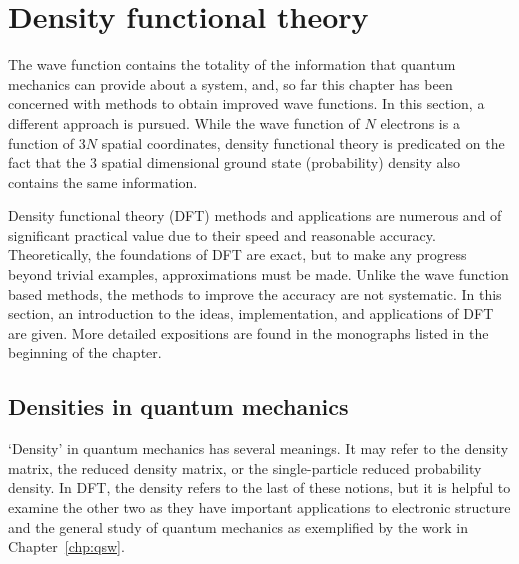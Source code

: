\documentclass[11pt,oneside,final]{huthesis}%
\begin{document}




 
\section{Density functional theory}\label{sec:dft}

The wave function  contains the totality of the information that quantum mechanics can provide about a system, and, so far this chapter has been concerned with methods to obtain improved wave functions.  In this section, a different approach is pursued.  While the wave function of $N$ electrons is a function of $3N$ spatial coordinates, density functional theory is predicated on the fact that the $3$ spatial dimensional ground state (probability) density also contains the same information. 

Density functional theory (DFT) methods and applications are numerous and of significant practical value due to their  speed and reasonable accuracy.  Theoretically, the foundations of DFT are exact, but to make any progress beyond trivial examples, approximations must be made.  Unlike the wave function based methods, the methods to improve the accuracy are not systematic.  In this section, an introduction to the ideas, implementation, and applications of DFT are given.  More detailed expositions are found in the monographs listed in the beginning of the chapter.

\subsection{Densities in quantum mechanics}

`Density' in quantum mechanics has several meanings.  It may refer to the density matrix, the reduced density matrix, or the single-particle reduced probability density.  In DFT, the density refers to the last of these notions, but it is helpful to examine the other two as they have important applications to electronic structure and the general study of quantum mechanics as exemplified by the work in Chapter~\ref{chp:qsw}. 
\end{document}
